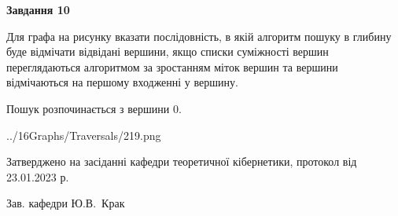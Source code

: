 \documentclass[12pt, ukrainian]{article}
\begin{document}
{\begin {large}
{\begin {center}\textbf{Завдання 10}\end {center}}\par
Для графа на рисунку вказати послідовність, в якій алгоритм пошуку в глибину буде відмічати відвідані вершини, якщо списки суміжності вершин переглядаються алгоритмом за зростанням міток вершин та вершини відмічаються на першому вход\-женні у вершину.\par
Пошук розпочинається з вершини 0.\par

\begin{center}
	{../16Graphs/Traversals/219.png}
\end{center}\par
\newpage


\end {large}
}
{\smallskip \begin {small} Затверджено на засіданні кафедри теоретичної кібернетики, протокол  від   23.01.2023 р.\par\smallskip\smallskip
{\parbox {6.5 cm}{Зав. кафедри \dotfill Ю.В.~Крак}} \end{small}}
\end{document}
